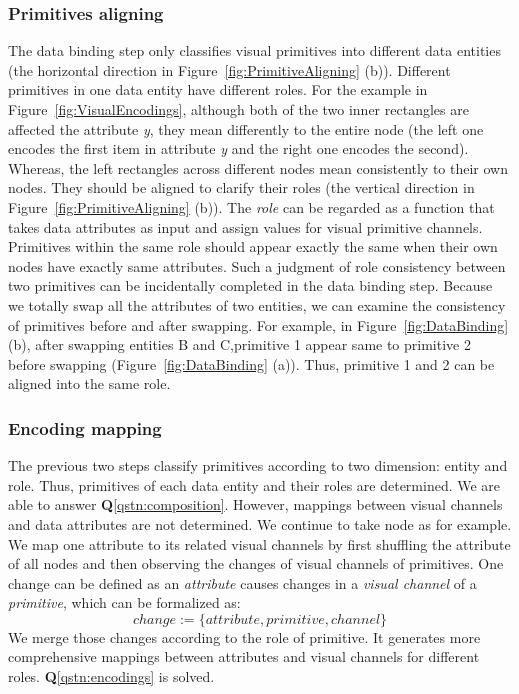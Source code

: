 \subsubsection{Primitives aligning}
The data binding step only classifies visual primitives into different data entities (the horizontal direction in Figure~\ref{fig:PrimitiveAligning} (b)).
Different primitives in one data entity have different roles.
For the example in Figure~\ref{fig:VisualEncodings}, although both of the two inner rectangles are affected the attribute \textit{y}, they mean differently to the entire node (the left one encodes the first item in attribute \textit{y} and the right one encodes the second).
Whereas, the left rectangles across different nodes mean consistently to their own nodes.
They should be aligned to clarify their roles (the vertical direction in Figure~\ref{fig:PrimitiveAligning} (b)).
The \textit{role} can be regarded as a function that takes data attributes as input and assign values for visual primitive channels.
Primitives within the same role should appear exactly the same when their own nodes have exactly same attributes.
Such a judgment of role consistency between two primitives can be incidentally completed in the data binding step.
Because we totally swap all the attributes of two entities, we can examine the consistency of primitives before and after swapping.
For example, in Figure~\ref{fig:DataBinding} (b), after swapping entities B and C,primitive 1 appear same to primitive 2 before swapping (Figure~\ref{fig:DataBinding} (a)). Thus, primitive 1 and 2 can be aligned into the same role.

\subsubsection{Encoding mapping}\label{sec:encodingmapping}
The previous two steps classify primitives according to two dimension: entity and role.
Thus, primitives of each data entity and their roles are determined.
We are able to answer \textbf{Q}\ref{qstn:composition}.
However, mappings between visual channels and data attributes are not determined.
We continue to take node as for example.
We map one attribute to its related visual channels by first shuffling the attribute of all nodes and then observing the changes of visual channels of primitives.
One change can be defined as an \textit{attribute} causes changes in a \textit{visual channel} of a \textit{primitive}, which can be formalized as:
\begin{equation}
    change := \{ attribute, primitive, channel \}
\end{equation}
We merge those changes according to the role of primitive.
It generates more comprehensive mappings between attributes and visual channels for different roles.
\textbf{Q}\ref{qstn:encodings} is solved.



